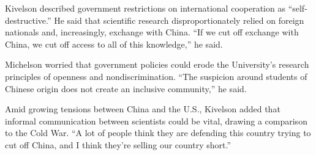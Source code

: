 \documentclass{article}%
\begin{document}
\par{Kivelson described government restrictions on international cooperation as “self-destructive.” He said that scientific research disproportionately relied on foreign nationals and, increasingly, exchange with China. “If we cut off exchange with China, we cut off access to all of this knowledge,” he said.}\\
\par{Michelson worried that government policies could erode the University’s research principles of openness and nondiscrimination. “The suspicion around students of Chinese origin does not create an inclusive community,” he said.}\\
\par{Amid growing tensions between China and the U.S., Kivelson added that informal communication between scientists could be vital, drawing a comparison to the Cold War. “A lot of people think they are defending this country trying to cut off China, and I think they’re selling our country short.”}\\
%
\end{document}
